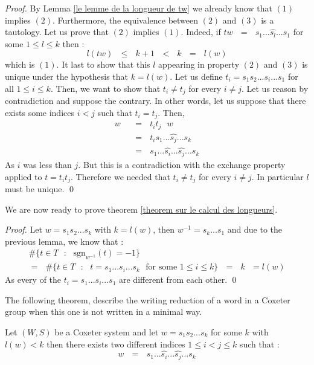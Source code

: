 \documentclass[envcountsame,envcountchap]{svmono}
\newcommand{\q}{\quad}
\newcommand{\qq}{\text{ }}
\begin{document}
\begin{proof}
	By Lemma \ref{le lemme de la longueur de tw} we already know that $(1)$ implies $(2)$. Furthermore, the equivalence between $(2)$ and $(3)$ is a tautology. Let us prove that $(2)$ implies $(1)$. Indeed, if $tw\qq=\qq s_1...\hat{s_l}...s_1$ for some $1\leq l\leq k$ then :
	\begin{equation}
	l(tw)\qq \leq \qq k+1\qq <\qq k \qq=\qq l(w)
	\end{equation}
	which is $(1)$. It last to show that this $l$ appearing in property $(2)$ and $(3)$ is unique under the hypothesis that $k=l(w)$. Let us define $t_i=s_1s_2...s_i...s_1$ for all $1\leq i\leq k$. Then, we want to show that  $t_i\not=t_j$ for every $i\not=j$. Let us reason by contradiction and suppose the contrary. In other words, let us suppose that there exists some indices $i<j$ such that $t_i=t_j$. Then,
	\begin{equation}
	\begin{split}
	w\qq&=\qq t_it_j\qq w\\
	&=\qq t_is_1...\hat{s_j}...s_k\\
	&=\qq s_1...\hat{s_i}...\hat{s_j}...s_k
	\end{split}
	\end{equation}
	As $i$ was less than $j$. But this is a contradiction with the exchange property applied to $t=t_it_j$. Therefore we needed that $t_i\not=t_j$ for every $i\not=j$. In particular $l$ must be unique.
	\qed
\end{proof}
We are now ready to prove theorem \ref{theorem sur le calcul des longueurs}.
\begin{proof}
	Let $w=s_1s_2...s_k$ with $k=l(w)$, then $w^{-1}=s_k...s_1$ and due to the previous lemma, we know that :
	\begin{equation}
	\begin{split}
		\#\{t\in T\qq :\qq \mbox{sgn}_{w^{-1}}(t)=-1\}\qq\q\q\q\q\q\q\q \\
		=\qq \# \{t\in T\qq:\qq t=s_1...s_i...s_k\qq \mbox{for some }1\leq i\leq k\}\qq=\qq k\qq =l(w)
	\end{split}
	\end{equation}
	As every of the $t_i=s_1...s_i...s_1$ are different from each other. \qed
\end{proof}
The following theorem, describe the writing reduction of a word in a Coxeter group when this one is not written in a minimal way.
\begin{theorem}
	Let $(W,S)$ be a Coxeter system and let $w=s_1s_2...s_k$ for some $k$ with $l(w)<k$ then there exists two different indices $1\leq i<j\leq k$ such that :
	\begin{equation}
	w\qq=\qq s_1...\hat{s_i}...\hat{s_j}...s_k
	\end{equation}
\end{theorem}
\end{document}
